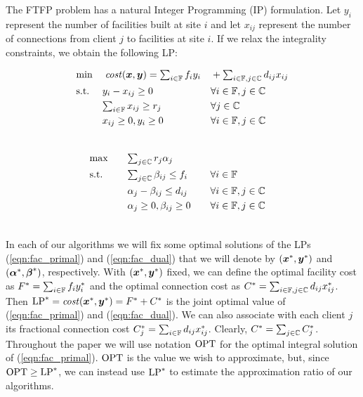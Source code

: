 \documentclass[11pt]{article}
\begin{document}
The FTFP problem has a natural Integer Programming (IP)
formulation. Let $y_i$ represent the number of facilities
built at site $i$ and let $x_{ij}$ represent the number of
connections from client $j$ to facilities at site $i$. If we
relax the integrality constraints, we obtain the following LP:

\noindent
\hspace{-0.1in}
\begin{minipage}{3.5in}
\begin{alignat}{3}
  &\textrm{min} &&\;\textstyle{{\it cost}(\boldsymbol{x},\boldsymbol{y})} = \textstyle{ \sum_{i\in \mathbb{F}}f_iy_i }
 		&&	+ \textstyle{ \sum_{i\in \mathbb{F}, j\in \mathbb{C}}d_{ij}x_{ij} }  \label{eqn:fac_primal} 	
								\\ \notag
  &\textrm{s.t.} && y_i - x_{ij} \geq 0 &&  \forall i\in \mathbb{F}, j\in \mathbb{C} 
									\\ \notag
  & &&\textstyle{\sum_{i\in \mathbb{F}} x_{ij} \geq r_j} && \forall j\in \mathbb{C}
 									\\ \notag
  & &&\textstyle{ x_{ij} \geq 0, y_i \geq 0} && \forall i\in \mathbb{F}, j\in \mathbb{C} 
  									\\ \notag
\end{alignat}
\end{minipage}
\hspace{0.01in}
\begin{minipage}{3in}
\begin{alignat}{3}
  &\textrm{max}&\quad& \textstyle{\sum_{j\in \mathbb{C}} r_j\alpha_j}\label{eqn:fac_dual}  
     						\\ \notag
  &\textrm{s.t.} && \textstyle{
    \sum_{j\in \mathbb{C}}\beta_{ij} \leq f_i}  &\quad& \forall i \in \mathbb{F}  
							\\ \notag
  & &&\textstyle{\alpha_{j} - \beta_{ij} \leq
    d_{ij}}  && \forall i\in \mathbb{F}, j\in \mathbb{C} 
							\\ \notag
  & &&\textstyle{\alpha_j \geq 0,
    \beta_{ij} \geq 0} && \forall i\in \mathbb{F}, j\in \mathbb{C}
  							\\ \notag
\end{alignat}
\end{minipage}

In each of our algorithms we will fix some optimal solutions of the
LPs (\ref{eqn:fac_primal}) and (\ref{eqn:fac_dual}) that we will
denote by $(\boldsymbol{x}^\ast, \boldsymbol{y}^\ast)$ and $(\boldsymbol{\alpha}^\ast,\boldsymbol{\beta}^\ast)$,
respectively. With $(\boldsymbol{x}^\ast, \boldsymbol{y}^\ast)$ fixed, we can define the
optimal facility cost as $F^\ast=\sum_{i\in\mathbb{F}} f_i y_i^\ast$
and the optimal connection cost as $C^\ast =
\sum_{i\in\mathbb{F},j\in\mathbb{C}} d_{ij}x_{ij}^\ast$.  Then
$\mbox{\rm LP}^\ast = {\it cost}(\boldsymbol{x}^\ast,\boldsymbol{y}^\ast) = F^\ast+C^\ast$ is the joint
optimal value of (\ref{eqn:fac_primal}) and (\ref{eqn:fac_dual}).  We
can also associate with each client $j$ its fractional connection cost
$C^\ast_j = \sum_{i\in\mathbb{F}} d_{ij}x_{ij}^\ast$.  Clearly, $C^\ast
= \sum_{j\in\mathbb{C}} C^\ast_j$.  Throughout the paper we will use
notation $\mbox{\rm OPT}$ for the optimal integral solution of
(\ref{eqn:fac_primal}).  $\mbox{\rm OPT}$ is the value we wish to approximate,
but, since $\mbox{\rm OPT}\ge\mbox{\rm LP}^\ast$, we can instead use $\mbox{\rm LP}^\ast$ to
estimate the approximation ratio of our algorithms.
\end{document}
